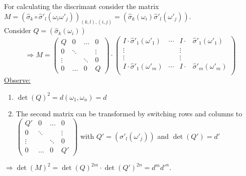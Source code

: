 \begin{Bew}
For calculating the discrimant consider the matrix $M= ( \hat{\sigma}_k \circ \hat{\sigma}'_l (\omega_i \omega'_j))_{(k,l),(i,j)} = (\hat{\sigma}_k(\omega_i) \hat{\sigma}'_l(\omega'_j))$.\\
Consider $Q= (\hat{\sigma}_k(\omega_i))$
\[
\Rightarrow M= \begin{pmatrix}
Q &0 &\dots &0\\
0 &\ddots & &\vdots\\
\vdots &&\ddots &0\\
0 &\hdots &0 &Q
\end{pmatrix}
\cdot
\begin{pmatrix}
I\cdot \hat{\sigma}'_1(\omega'_1) &\cdots &I\cdot &\hat{\sigma}'_1(\omega'_1)\\
\vdots & &\vdots\\
\vdots &  &\vdots\\
I\cdot \hat{\sigma}'_1(\omega'_m) &\cdots &I\cdot &\hat{\sigma}'_m(\omega'_m)\\
\end{pmatrix}
\]
\underline{Observe:}
\begin{enumerate}[(1)]
\item $\det(Q)^2=d(\omega_1, \omega_n)=d$
\item The second matrix can be transformed by switching rows and columns to $\begin{pmatrix}
Q' &0 &\dots &0\\
0 &\ddots & &\vdots\\
\vdots &&\ddots &0\\
0 &\hdots &0 &Q'
\end{pmatrix}$ with $Q'=(\sigma'_l(\omega'_j))$ and $\det(Q')=d'$
\end{enumerate}
$\Rightarrow \det(M)^2=\det(Q)^{2m} \cdot \det(Q')^{2n} = d^m d'^n$.
\end{Bew}
